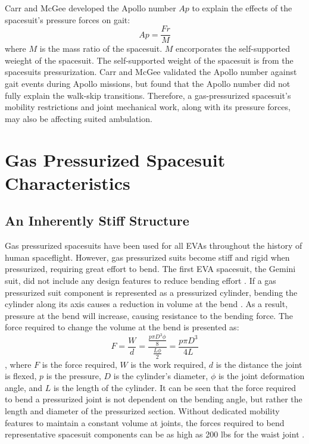 \documentclass[defaultstyle,11pt]{comps}
\begin{document}
Carr and McGee \citep{Carr2009} developed the Apollo number \(Ap\) to explain the effects of the spacesuit's pressure forces on gait:
\[
Ap = \frac{Fr}{M}
\]
where \(M\) is the mass ratio of the spacesuit.
\(M\) encorporates the self-supported weieght of the spacesuit.
The self-supported weight of the spacesuit is from the spacesuits pressurization.
Carr and McGee validated the Apollo number against gait events during Apollo missions, but found that the Apollo number did not fully explain the walk-skip transitions.
Therefore, a gas-pressurized spacesuit's mobility restrictions and joint mechanical work, along with its pressure forces, may also be affecting suited ambulation.

\hypertarget{gas-pressurized-spacesuit-characteristics}{%
\section{Gas Pressurized Spacesuit Characteristics}\label{gas-pressurized-spacesuit-characteristics}}

\hypertarget{an-inherently-stiff-structure}{%
\subsection{An Inherently Stiff Structure}\label{an-inherently-stiff-structure}}

Gas pressurized spacesuits have been used for all EVAs throughout the history of human spaceflight.
However, gas pressurized suits become stiff and rigid when pressurized, requiring great effort to bend.
The first EVA spacesuit, the Gemini suit, did not include any design features to reduce bending effort \citep{Thomas2012}.
If a gas pressurized suit component is represented as a pressurized cylinder, bending the cylinder along its axis causes a reduction in volume at the bend \citep{Harris2001}.
As a result, pressure at the bend will increase, causing resistance to the bending force.
The force required to change the volume at the bend is presented as:
\[
F = \frac{W}{d} = \frac{\frac{p\pi D^{3}\phi}{8}}{\frac{L\phi}{2}} = \frac{p\pi D^{3}}{4L}
\]
\citep{Newman1997, Harris2001}, where \(F\) is the force required, \(W\) is the work required, \(d\) is the distance the joint is flexed, \(p\) is the pressure, \(D\) is the cylinder's diameter, \(\phi\) is the joint deformation angle, and \(L\) is the length of the cylinder.
It can be seen that the force required to bend a pressurized joint is not dependent on the bending angle, but rather the length and diameter of the pressurized section.
Without dedicated mobility features to maintain a constant volume at joints, the forces required to bend representative spacesuit components can be as high as 200 lbs for the waist joint \citep{Newman1997}.
\end{document}
